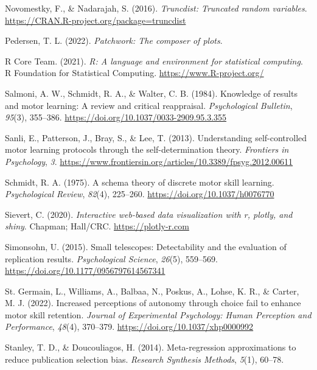 \documentclass[
  man, donotrepeattitle,floatsintext]{apa7}
\newlength{\cslhangindent}
\newlength{\cslentryspacingunit} %
\newenvironment{CSLReferences}[2] %
 {%
  \setlength{\parindent}{0pt}
  \ifodd #1
  \let\oldpar\par
  \def\par{\hangindent=\cslhangindent\oldpar}
  \fi
  \setlength{\parskip}{#2\cslentryspacingunit}
 }%
 {}
\begin{document}
\begin{CSLReferences}{1}{0}
\leavevmode{}%
Novomestky, F., \& Nadarajah, S. (2016). \emph{Truncdist: Truncated random variables}. \url{https://CRAN.R-project.org/package=truncdist}

\leavevmode{}%
Pedersen, T. L. (2022). \emph{Patchwork: The composer of plots}.

\leavevmode{}%
R Core Team. (2021). \emph{R: A language and environment for statistical computing}. R Foundation for Statistical Computing. \url{https://www.R-project.org/}

\leavevmode{}%
Salmoni, A. W., Schmidt, R. A., \& Walter, C. B. (1984). Knowledge of results and motor learning: A review and critical reappraisal. \emph{Psychological Bulletin}, \emph{95}(3), 355--386. \url{https://doi.org/10.1037/0033-2909.95.3.355}

\leavevmode{}%
Sanli, E., Patterson, J., Bray, S., \& Lee, T. (2013). Understanding self-controlled motor learning protocols through the self-determination theory. \emph{Frontiers in Psychology}, \emph{3}. \url{https://www.frontiersin.org/articles/10.3389/fpsyg.2012.00611}

\leavevmode{}%
Schmidt, R. A. (1975). A schema theory of discrete motor skill learning. \emph{Psychological Review}, \emph{82}(4), 225--260. \url{https://doi.org/10.1037/h0076770}

\leavevmode{}%
Sievert, C. (2020). \emph{Interactive web-based data visualization with r, plotly, and shiny}. Chapman; Hall/CRC. \url{https://plotly-r.com}

\leavevmode{}%
Simonsohn, U. (2015). Small telescopes: Detectability and the evaluation of replication results. \emph{Psychological Science}, \emph{26}(5), 559--569. \url{https://doi.org/10.1177/0956797614567341}

\leavevmode{}%
St. Germain, L., Williams, A., Balbaa, N., Poskus, A., Lohse, K. R., \& Carter, M. J. (2022). Increased perceptions of autonomy through choice fail to enhance motor skill retention. \emph{Journal of Experimental Psychology: Human Perception and Performance}, \emph{48}(4), 370--379. \url{https://doi.org/10.1037/xhp0000992}

\leavevmode{}%
Stanley, T. D., \& Doucouliagos, H. (2014). Meta-regression approximations to reduce publication selection bias. \emph{Research Synthesis Methods}, \emph{5}(1), 60--78.


\end{CSLReferences}
\end{document}
